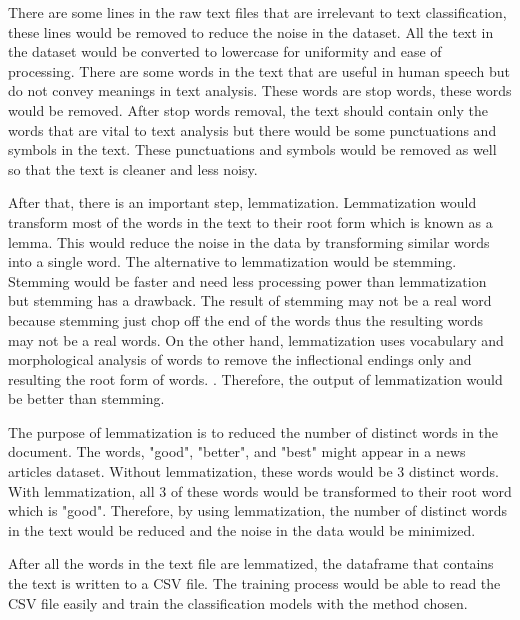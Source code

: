 There are some lines in the raw text files that are irrelevant to text classification, these lines would be removed to reduce the noise in the dataset. All the text in the dataset would be converted to lowercase for uniformity and ease of processing. There are some words in the text that are useful in human speech but do not convey meanings in text analysis. These words are stop words, these words would be removed. After stop words removal, the text should contain only the words that are vital to text analysis but there would be some punctuations and symbols in the text. These punctuations and symbols would be removed as well so that the text is cleaner and less noisy.

After that, there is an important step, lemmatization. Lemmatization would transform most of the words in the text to their root form which is known as a lemma. This would reduce the noise in the data by transforming similar words into a single word. The alternative to lemmatization would be stemming. Stemming would be faster and need less processing power than lemmatization but stemming has a drawback. The result of stemming may not be a real word because stemming just chop off the end of the words thus the resulting words may not be a real words. On the other hand, lemmatization uses vocabulary and morphological analysis of words to remove the inflectional endings only and resulting the root form of words. \cite{stemLemma}. Therefore, the output of lemmatization would be better than stemming.

The purpose of lemmatization is to reduced the number of distinct words in the document. The words, "good", "better", and "best" might appear in a news articles dataset. Without lemmatization, these words would be 3 distinct words. With lemmatization, all 3 of these words would be transformed to their root word which is "good". Therefore, by using lemmatization, the number of distinct words in the text would be reduced and the noise in the data would be minimized.

After all the words in the text file are lemmatized, the dataframe that contains the text is written to a CSV file. The training process would be able to read the CSV file easily and train the classification models with the method chosen.\\


